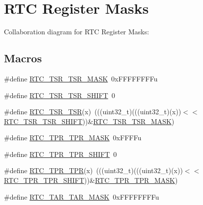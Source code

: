 \hypertarget{group___r_t_c___register___masks}{}\section{R\+TC Register Masks}
\label{group___r_t_c___register___masks}
Collaboration diagram for R\+TC Register Masks\+:
\subsection*{Macros}
\begin{DoxyCompactItemize}
\item 
\#define \hyperlink{group___r_t_c___register___masks_ga9a0f8842e8262ca176fcf028982153af}{R\+T\+C\+\_\+\+T\+S\+R\+\_\+\+T\+S\+R\+\_\+\+M\+A\+SK}~0x\+F\+F\+F\+F\+F\+F\+F\+Fu
\item 
\#define \hyperlink{group___r_t_c___register___masks_gad0476d1e39a866b5b5ba4728b55e258a}{R\+T\+C\+\_\+\+T\+S\+R\+\_\+\+T\+S\+R\+\_\+\+S\+H\+I\+FT}~0
\item 
\#define \hyperlink{group___r_t_c___register___masks_ga0265b25e77883b6b0cb056ab697b5bc6}{R\+T\+C\+\_\+\+T\+S\+R\+\_\+\+T\+SR}(x)~(((uint32\+\_\+t)(((uint32\+\_\+t)(x))$<$$<$\hyperlink{group___r_t_c___register___masks_gad0476d1e39a866b5b5ba4728b55e258a}{R\+T\+C\+\_\+\+T\+S\+R\+\_\+\+T\+S\+R\+\_\+\+S\+H\+I\+FT}))\&\hyperlink{group___r_t_c___register___masks_ga9a0f8842e8262ca176fcf028982153af}{R\+T\+C\+\_\+\+T\+S\+R\+\_\+\+T\+S\+R\+\_\+\+M\+A\+SK})
\item 
\#define \hyperlink{group___r_t_c___register___masks_ga2682f687fa561be2f002fc574d48cc79}{R\+T\+C\+\_\+\+T\+P\+R\+\_\+\+T\+P\+R\+\_\+\+M\+A\+SK}~0x\+F\+F\+F\+Fu
\item 
\#define \hyperlink{group___r_t_c___register___masks_ga624a290f73478b3ca2687ac49cc78fb2}{R\+T\+C\+\_\+\+T\+P\+R\+\_\+\+T\+P\+R\+\_\+\+S\+H\+I\+FT}~0
\item 
\#define \hyperlink{group___r_t_c___register___masks_gac2c160abce9b85ad4d9386f0dd8c31ea}{R\+T\+C\+\_\+\+T\+P\+R\+\_\+\+T\+PR}(x)~(((uint32\+\_\+t)(((uint32\+\_\+t)(x))$<$$<$\hyperlink{group___r_t_c___register___masks_ga624a290f73478b3ca2687ac49cc78fb2}{R\+T\+C\+\_\+\+T\+P\+R\+\_\+\+T\+P\+R\+\_\+\+S\+H\+I\+FT}))\&\hyperlink{group___r_t_c___register___masks_ga2682f687fa561be2f002fc574d48cc79}{R\+T\+C\+\_\+\+T\+P\+R\+\_\+\+T\+P\+R\+\_\+\+M\+A\+SK})
\item 
\#define \hyperlink{group___r_t_c___register___masks_ga649a76416ad00079054bd866565dada2}{R\+T\+C\+\_\+\+T\+A\+R\+\_\+\+T\+A\+R\+\_\+\+M\+A\+SK}~0x\+F\+F\+F\+F\+F\+F\+F\+Fu

\end{DoxyCompactItemize}
